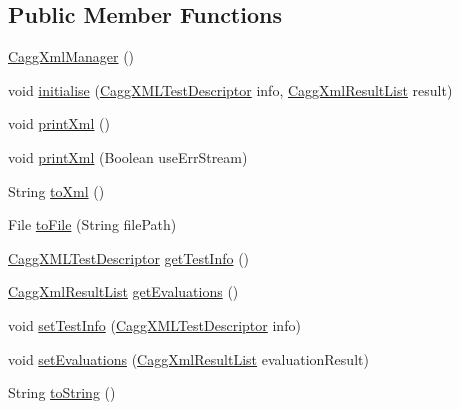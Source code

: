 \subsection*{Public Member Functions}
\begin{DoxyCompactItemize}
\item 
\hyperlink{classit_1_1emarolab_1_1cagg_1_1debugging_1_1result2XML_1_1CaggXmlManager_a6afe0758769167f44715113e93db4728}{Cagg\-Xml\-Manager} ()
\item 
void \hyperlink{classit_1_1emarolab_1_1cagg_1_1debugging_1_1result2XML_1_1CaggXmlManager_ab6cd3fa598ab0d6d4acdfea525e5c086}{initialise} (\hyperlink{classit_1_1emarolab_1_1cagg_1_1debugging_1_1result2XML_1_1CaggXMLTestDescriptor}{Cagg\-X\-M\-L\-Test\-Descriptor} info, \hyperlink{classit_1_1emarolab_1_1cagg_1_1debugging_1_1result2XML_1_1CaggXmlResultList}{Cagg\-Xml\-Result\-List} result)
\item 
void \hyperlink{classit_1_1emarolab_1_1cagg_1_1debugging_1_1result2XML_1_1CaggXmlManager_ab9cb8f02817e954b4f10a202592293d2}{print\-Xml} ()
\item 
void \hyperlink{classit_1_1emarolab_1_1cagg_1_1debugging_1_1result2XML_1_1CaggXmlManager_a6b23f98bc1bdfca95eeaf4442fc608a3}{print\-Xml} (Boolean use\-Err\-Stream)
\item 
String \hyperlink{classit_1_1emarolab_1_1cagg_1_1debugging_1_1result2XML_1_1CaggXmlManager_a1c150d8744a0fc1a8f1c345aaacd130d}{to\-Xml} ()
\item 
File \hyperlink{classit_1_1emarolab_1_1cagg_1_1debugging_1_1result2XML_1_1CaggXmlManager_a9a154497c420d3615b5860038536cae4}{to\-File} (String file\-Path)
\item 
\hyperlink{classit_1_1emarolab_1_1cagg_1_1debugging_1_1result2XML_1_1CaggXMLTestDescriptor}{Cagg\-X\-M\-L\-Test\-Descriptor} \hyperlink{classit_1_1emarolab_1_1cagg_1_1debugging_1_1result2XML_1_1CaggXmlManager_aacae3af46b840239230bd9ccb14b06d8}{get\-Test\-Info} ()
\item 
\hyperlink{classit_1_1emarolab_1_1cagg_1_1debugging_1_1result2XML_1_1CaggXmlResultList}{Cagg\-Xml\-Result\-List} \hyperlink{classit_1_1emarolab_1_1cagg_1_1debugging_1_1result2XML_1_1CaggXmlManager_ab6726f30077dd302ddea67a933e63dc0}{get\-Evaluations} ()
\item 
void \hyperlink{classit_1_1emarolab_1_1cagg_1_1debugging_1_1result2XML_1_1CaggXmlManager_ab6617b4744217ee65016a6d9fe16160e}{set\-Test\-Info} (\hyperlink{classit_1_1emarolab_1_1cagg_1_1debugging_1_1result2XML_1_1CaggXMLTestDescriptor}{Cagg\-X\-M\-L\-Test\-Descriptor} info)
\item 
void \hyperlink{classit_1_1emarolab_1_1cagg_1_1debugging_1_1result2XML_1_1CaggXmlManager_a739bc2fe781d566ce2a71b30828807b8}{set\-Evaluations} (\hyperlink{classit_1_1emarolab_1_1cagg_1_1debugging_1_1result2XML_1_1CaggXmlResultList}{Cagg\-Xml\-Result\-List} evaluation\-Result)
\item 
String \hyperlink{classit_1_1emarolab_1_1cagg_1_1debugging_1_1result2XML_1_1CaggXmlManager_a9306714655b1f4ba76be9a9d65dd5f4d}{to\-String} ()
\end{DoxyCompactItemize}
